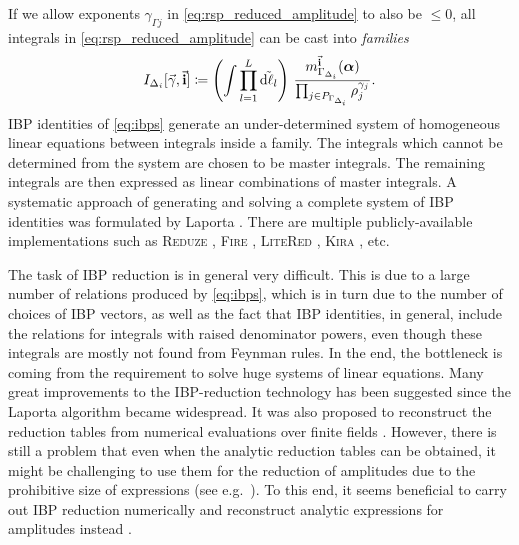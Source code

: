 If we allow exponents $\gamma_{\Gamma j}$ in \cref{eq:rsp_reduced_amplitude} to also be $\leq0$,
all integrals in \cref{eq:rsp_reduced_amplitude} can be cast into \emph{families}
\begin{equation} \label{eq:integral_families}
    I_{\Delta_i}[\va{\gamma},\va{i}] \coloneqq 
  \qty(\int \prod_{l=1}^{L} \tilde{\dd{\ell_l}}) ~  
  \frac{m^{\va{i}}_{\Gamma_{\Delta_i}}(\vb*{\alpha})%
    }{\prod_{j\in P_{\Gamma_{\Delta_i}}} \rho_j^{\gamma_{j}}}.
\end{equation}
IBP identities of \cref{eq:ibps} generate an under-determined system of homogeneous linear equations between integrals inside a family.
The integrals which cannot be determined from the system are chosen to be master integrals.
The remaining integrals are then expressed as linear combinations of master integrals.
A systematic approach of generating and solving a complete system of IBP identities was formulated by Laporta \cite{Laporta:2001dd}.
There are multiple publicly-available implementations such as
\textsc{Reduze} \cite{Studerus:2009ye,vonManteuffel:2012np},
\textsc{Fire} \cite{Smirnov:2008iw,Smirnov:2014hma},
\textsc{LiteRed} \cite{Lee:2012cn,Lee:2013mka},
\textsc{Kira} \cite{Maierhoefer:2017hyi,Maierhofer:2018gpa}, etc.

The task of IBP reduction is in general very difficult.
This is due to a large number of relations produced by \cref{eq:ibps},
which is in turn due to the number of choices of IBP vectors, as well as the fact that IBP identities,
in general, include the relations for integrals with raised denominator powers, even
though these integrals are mostly not found from Feynman rules.
In the end, the bottleneck is coming from the requirement to solve huge systems of linear equations.
Many great improvements to the IBP-reduction technology has been suggested
\cite{Gluza:2010ws,Schabinger:2011dz,Larsen:2015ped,Bern:2017gdk,Chawdhry:2018awn,Kosower:2018obg,Mastrolia:2018uzb,Frellesvig:2019kgj,Frellesvig:2019uqt,Bendle2019}
since the Laporta algorithm became widespread.
It was also proposed to reconstruct the reduction tables from
numerical evaluations over finite fields \cite{vonManteuffel:2014ixa,Peraro:2016wsq,Peraro:2019svx,Klappert:2019emp,Smirnov:2019qkx}.
However, there is still a problem
that even when the analytic reduction tables can be obtained,
it might be challenging to use them for the reduction of amplitudes due
to the prohibitive size of expressions (see e.g.\ \cite{Chawdhry:2018awn,Bendle2019}).
To this end, it seems beneficial to carry out IBP reduction numerically and reconstruct
analytic expressions for amplitudes instead \cite{Badger:2018enw,Chicherin:2018yne,Badger:2019djh}.

